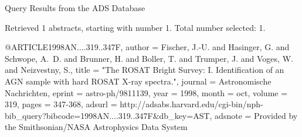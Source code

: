 Query Results from the ADS Database


Retrieved 1 abstracts, starting with number 1.  Total number selected: 1.

@ARTICLE{1998AN....319..347F,
   author = {{Fischer}, J.-U. and {Hasinger}, G. and {Schwope}, A.~D. and 
	{Brunner}, H. and {Boller}, T. and {Trumper}, J. and {Voges}, W. and 
	{Neizvestny}, S.},
    title = "{The ROSAT Bright Survey: I. Identification of an AGN sample with hard ROSAT X-ray spectra.}",
  journal = {Astronomische Nachrichten},
   eprint = {astro-ph/9811139},
     year = 1998,
    month = oct,
   volume = 319,
    pages = {347-368},
   adsurl = {http://adsabs.harvard.edu/cgi-bin/nph-bib_query?bibcode=1998AN....319..347F&db_key=AST},
  adsnote = {Provided by the Smithsonian/NASA Astrophysics Data System}
}


